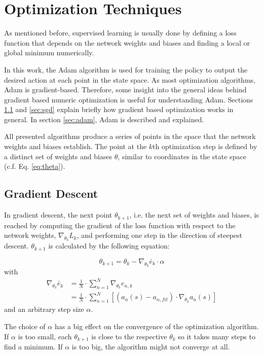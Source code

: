 \section{Optimization Techniques}

As mentioned before, supervised learning is usually done by defining a loss function that depends on the network weights and biases and finding a local or global minimum numerically.

In this work, the Adam algorithm is used for training the policy to output the desired action at each point in the state space. As most optimization algorithms, Adam is gradient-based. Therefore, some insight into the general ideas behind gradient based numeric optimization is useful for understanding Adam. Sections \ref{sec:grad_desc} and \ref{sec:sgd} explain briefly how gradient based optimization works in general. In section \ref{sec:adam}, Adam is described and explained.

All presented algorithms produce a series of points in the space that the network weights and biases establish. The point at the $k$th optimization step is defined by a distinct set of weights and biases $\theta$, similar to coordinates in the state space (c.f. Eq. \ref{eq:theta}).

\subsection{Gradient Descent}
\label{sec:grad_desc}

In gradient descent, the next point $\theta_{k+1}$, i.e. the next set of weights and biases, is reached by computing the gradient of the loss function with respect to the network weights, $\nabla_{\theta_k}L_k$, and performing one step in the direction of steepest descent. $\theta_{k+1}$ is calculated by the following equation:

\begin{equation}
\theta_{k+1} = \theta_k - \nabla_{\theta_k}\bar{e}_k\cdot \alpha
\label{eq:gd_update}
\end{equation}
with
\begin{align}
\nabla_{\theta_k}\bar{e}_k &=\frac{1}{N}\cdot\sum_{n=1}^{N}\nabla_{\theta_k}e_{n,k} \\
&=\frac{1}{N}\cdot\sum_{n=1}^{N}[(a_n(s)-a_{n,fit})\cdot\nabla_{\theta_k}a_n(s)]
\end{align}
and an arbitrary step size $\alpha$.

The choice of $\alpha$ has a big effect on the convergence of the optimization algorithm. If $\alpha$ is too small, each $\theta_{k+1}$ is close to the respective $\theta_{k}$ so it takes many steps to find a minimum. If $\alpha$ is too big, the algorithm might not converge at all.

